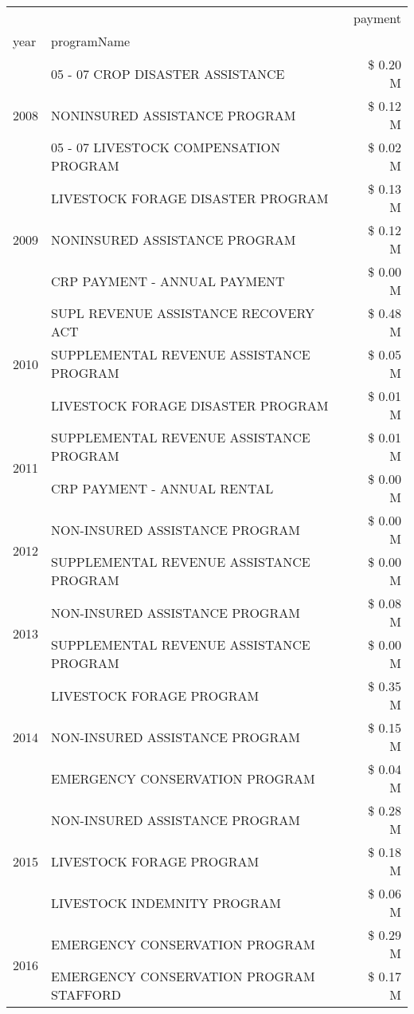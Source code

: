 \begin{tabular}{llr}
\toprule
 &  & payment \\
year & programName &  \\
\midrule
\multirow[t]{3}{*}{2008} & 05 - 07 CROP DISASTER ASSISTANCE & \$ 0.20 M \\
 & NONINSURED ASSISTANCE PROGRAM & \$ 0.12 M \\
 & 05 - 07 LIVESTOCK COMPENSATION PROGRAM & \$ 0.02 M \\
\cline{1-3}
\multirow[t]{3}{*}{2009} & LIVESTOCK FORAGE DISASTER  PROGRAM & \$ 0.13 M \\
 & NONINSURED ASSISTANCE PROGRAM & \$ 0.12 M \\
 & CRP PAYMENT - ANNUAL PAYMENT & \$ 0.00 M \\
\cline{1-3}
\multirow[t]{3}{*}{2010} & SUPL REVENUE ASSISTANCE RECOVERY ACT & \$ 0.48 M \\
 & SUPPLEMENTAL REVENUE ASSISTANCE PROGRAM & \$ 0.05 M \\
 & LIVESTOCK FORAGE DISASTER  PROGRAM & \$ 0.01 M \\
\cline{1-3}
\multirow[t]{2}{*}{2011} & SUPPLEMENTAL REVENUE ASSISTANCE PROGRAM & \$ 0.01 M \\
 & CRP PAYMENT - ANNUAL RENTAL & \$ 0.00 M \\
\cline{1-3}
\multirow[t]{2}{*}{2012} & NON-INSURED ASSISTANCE PROGRAM & \$ 0.00 M \\
 & SUPPLEMENTAL REVENUE ASSISTANCE PROGRAM & \$ 0.00 M \\
\cline{1-3}
\multirow[t]{2}{*}{2013} & NON-INSURED ASSISTANCE PROGRAM & \$ 0.08 M \\
 & SUPPLEMENTAL REVENUE ASSISTANCE PROGRAM & \$ 0.00 M \\
\cline{1-3}
\multirow[t]{3}{*}{2014} & LIVESTOCK FORAGE PROGRAM & \$ 0.35 M \\
 & NON-INSURED ASSISTANCE PROGRAM & \$ 0.15 M \\
 & EMERGENCY CONSERVATION PROGRAM & \$ 0.04 M \\
\cline{1-3}
\multirow[t]{3}{*}{2015} & NON-INSURED ASSISTANCE PROGRAM & \$ 0.28 M \\
 & LIVESTOCK FORAGE PROGRAM & \$ 0.18 M \\
 & LIVESTOCK INDEMNITY PROGRAM & \$ 0.06 M \\
\cline{1-3}
\multirow[t]{3}{*}{2016} & EMERGENCY CONSERVATION PROGRAM                & \$ 0.29 M \\
 & EMERGENCY CONSERVATION PROGRAM STAFFORD       & \$ 0.17 M \\

\end{tabular}
